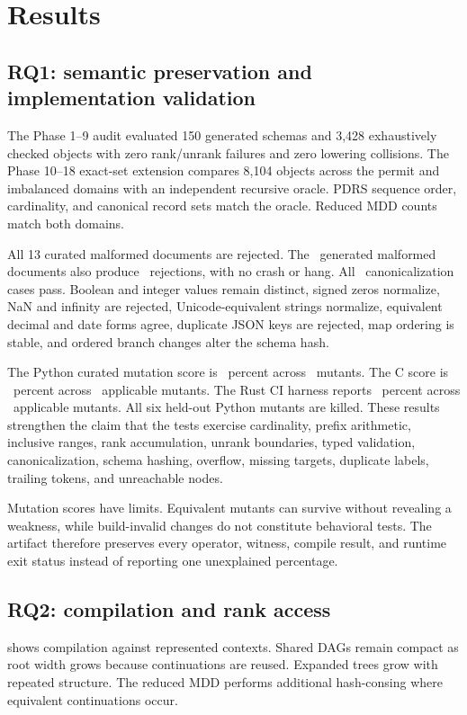 \section{Results}\label{sec:results}
\subsection{RQ1: semantic preservation and implementation validation}
The Phase 1--9 audit evaluated 150 generated schemas and 3,428 exhaustively checked objects with zero rank/unrank failures and zero lowering collisions. The Phase 10--18 exact-set extension compares 8,104 objects across the permit and imbalanced domains with an independent recursive oracle. PDRS sequence order, cardinality, and canonical record sets match the oracle. Reduced MDD counts match both domains.

All 13 curated malformed documents are rejected. The \MalformedFuzz\ generated malformed documents also produce \MalformedFuzz\ rejections, with no crash or hang. All \CanonicalCases\ canonicalization cases pass. Boolean and integer values remain distinct, signed zeros normalize, NaN and infinity are rejected, Unicode-equivalent strings normalize, equivalent decimal and date forms agree, duplicate JSON keys are rejected, map ordering is stable, and ordered branch changes alter the schema hash.

The Python curated mutation score is \PythonMutationScore\ percent across \PythonMutants\ mutants. The C score is \CMutationScore\ percent across \CMutants\ applicable mutants. The Rust CI harness reports \RustMutationScore\ percent across \RustMutants\ applicable mutants. All six held-out Python mutants are killed. These results strengthen the claim that the tests exercise cardinality, prefix arithmetic, inclusive ranges, rank accumulation, unrank boundaries, typed validation, canonicalization, schema hashing, overflow, missing targets, duplicate labels, trailing tokens, and unreachable nodes.

Mutation scores have limits. Equivalent mutants can survive without revealing a weakness, while build-invalid changes do not constitute behavioral tests. The artifact therefore preserves every operator, witness, compile result, and runtime exit status instead of reporting one unexplained percentage.

\subsection{RQ2: compilation and rank access}
 shows compilation against represented contexts. Shared DAGs remain compact as root width grows because continuations are reused. Expanded trees grow with repeated structure. The reduced MDD performs additional hash-consing where equivalent continuations occur.

